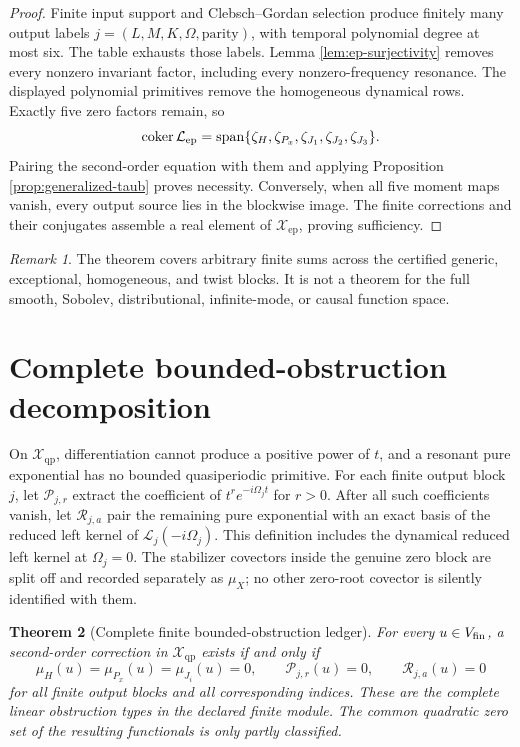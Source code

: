 \documentclass[11pt]{article}
\newtheorem{theorem}{Theorem}[section]
\theoremstyle{definition}
\theoremstyle{remark}
\newtheorem{remark}[theorem]{Remark}
\newcommand{\cL}{\mathcal L}
\newcommand{\cP}{\mathcal P}
\newcommand{\cR}{\mathcal R}
\newcommand{\Xep}{\mathscr X_{\mathrm{ep}}}
\newcommand{\Xqp}{\mathscr X_{\mathrm{qp}}}
\newcommand{\coker}{\operatorname{coker}}
\begin{document}
\begin{proof}
Finite input support and Clebsch--Gordan selection produce finitely many
output labels \(j=(L,M,K,\Omega,\text{parity})\), with temporal polynomial
degree at most six.  The table exhausts those labels.  Lemma
\ref{lem:ep-surjectivity} removes every nonzero invariant factor, including
every nonzero-frequency resonance.  The displayed polynomial primitives
remove the homogeneous dynamical rows.  Exactly five zero factors remain,
so
\[
 \coker\cL_{\rm ep}
 =\operatorname{span}\{\zeta_H,\zeta_{P_x},
       \zeta_{J_1},\zeta_{J_2},\zeta_{J_3}\}.
\]
Pairing the second-order equation with them and applying Proposition
\ref{prop:generalized-taub} proves necessity.  Conversely, when all five
moment maps vanish, every output source lies in the blockwise image.  The
finite corrections and their conjugates assemble a real element of
\(\Xep\), proving sufficiency.
\end{proof}

\begin{remark}
The theorem covers arbitrary finite sums across the certified generic,
exceptional, homogeneous, and twist blocks.  It is not a theorem for the
full smooth, Sobolev, distributional, infinite-mode, or causal function
space.
\end{remark}

\section{Complete bounded-obstruction decomposition}

On \(\Xqp\), differentiation cannot produce a positive power of \(t\), and
a resonant pure exponential has no bounded quasiperiodic primitive.  For each
finite output block \(j\), let \(\cP_{j,r}\) extract the coefficient of
\(t^re^{-i\Omega_jt}\) for \(r>0\).  After all such coefficients vanish,
let \(\cR_{j,a}\) pair the remaining pure exponential with an exact basis of
the reduced left kernel of \(\cL_j(-i\Omega_j)\).  This definition includes
the dynamical reduced left kernel at \(\Omega_j=0\).  The stabilizer
covectors inside the genuine zero block are split off and recorded separately
as \(\mu_X\); no other zero-root covector is silently identified with them.

\begin{theorem}[Complete finite bounded-obstruction ledger]
\label{thm:bounded-ledger}
For every \(u\in V_{\rm fin}\), a second-order correction in \(\Xqp\) exists
if and only if
\begin{equation}\label{eq:bounded-cokernel}
 \mu_H(u)=\mu_{P_x}(u)=\mu_{J_i}(u)=0,
 \qquad
 \cP_{j,r}(u)=0,
 \qquad
 \cR_{j,a}(u)=0
\end{equation}
for all finite output blocks and all corresponding indices.  These are the
complete linear obstruction types in the declared finite module.  The common
quadratic zero set of the resulting functionals is only partly classified.
\end{theorem}
\end{document}
